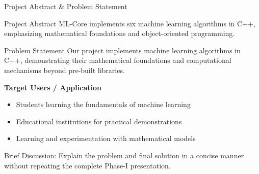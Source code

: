 \documentclass[aspectratio=169,11pt]{beamer}
\newcommand{\smallnote}[1]{%
\vspace{0.08cm}
{\scriptsize\color{GEUGrey}#1}
}
\begin{document}
\begin{frame}{Project Abstract \& Problem Statement}

\begin{block}{Project Abstract}
ML-Core implements six machine learning algorithms in C++, emphasizing mathematical foundations and object-oriented programming.
\end{block}
\vspace{2mm}
\begin{block}{Problem Statement}
{
Our project implements machine learning algorithms in C++, demonstrating their mathematical foundations and computational mechanisms beyond pre-built libraries.
}
\end{block}
\vspace{2mm}
\textbf{\color{GEUBlue}Target Users / Application}
\begin{itemize}\itemsep2pt
    \item {Students learning the fundamentals of machine learning}
    \item {Educational institutions for practical demonstrations}
    \item {Learning and experimentation with mathematical models}
\end{itemize}

\smallnote{
Brief Discussion: Explain the problem and final solution in a concise
manner without repeating the complete Phase-I presentation.
}

\end{frame}
\end{document}
